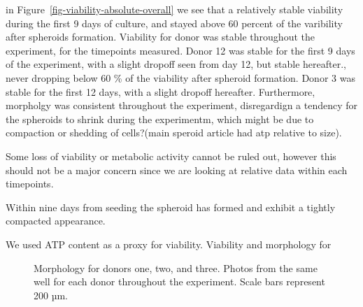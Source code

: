 \documentclass[
  letterpaper,
  DIV=11,
  numbers=noendperiod,
  oneside]{scrartcl}
\begin{document}
in Figure~\ref{fig-viability-absolute-overall} we see that a relatively
stable viability during the first 9 days of culture, and stayed above 60
percent of the varibility after spheroids formation. Viability for donor
was stable throughout the experiment, for the timepoints measured. Donor
12 was stable for the first 9 days of the experiment, with a slight
dropoff seen from day 12, but stable hereafter., never dropping below 60
\% of the viability after spheroid formation. Donor 3 was stable for the
first 12 days, with a slight dropoff hereafter. Furthermore, morpholgy
was consistent throughout the experiment, disregardign a tendency for
the spheroids to shrink during the experimentm, which might be due to
compaction or shedding of cells?(main speroid article had atp relative
to size).

Some loss of viability or metabolic activity cannot be ruled out,
however this should not be a major concern since we are looking at
relative data within each timepoints.

Within nine days from seeding the spheroid has formed and exhibit a
tightly compacted appearance.

We used ATP content as a proxy for viability. Viability and morphology
for

\begin{figure}


\caption{\label{fig-morph}Morphology for donors one, two, and three.
Photos from the same well for each donor throughout the experiment.
Scale bars represent 200 µm.}

\end{figure}%
\end{document}
